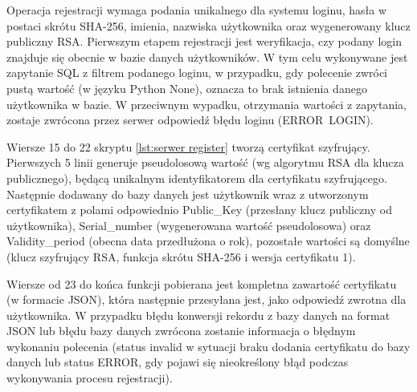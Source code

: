 \documentclass[twoside,10pt]{article}
\begin{document}
Operacja rejestracji wymaga podania unikalnego dla systemu loginu, hasła w postaci skrótu SHA-256, imienia, nazwiska użytkownika oraz wygenerowany klucz publiczny RSA. Pierwszym etapem rejestracji jest weryfikacja, czy podany login znajduje się obecnie w bazie danych użytkowników. W tym celu wykonywane jest zapytanie SQL z filtrem podanego loginu, w przypadku, gdy polecenie zwróci pustą wartość (w języku Python None), oznacza to brak istnienia danego użytkownika w bazie. W przeciwnym wypadku, otrzymania wartości z zapytania, zostaje zwrócona przez serwer odpowiedź błędu loginu (ERROR~LOGIN).

Wiersze 15 do 22 skryptu \ref{lst:serwer register} tworzą certyfikat szyfrujący. Pierwszych 5 linii generuje pseudolosową wartość (wg algorytmu RSA dla klucza publicznego), będącą unikalnym identyfikatorem dla certyfikatu szyfrującego. Następnie dodawany do bazy danych jest użytkownik wraz z utworzonym certyfikatem z polami odpowiednio Public\_Key (przesłany klucz publiczny od użytkownika), Serial\_number (wygenerowana wartość pseudolosowa) oraz Validity\_period (obecna data przedłużona o rok), pozostałe wartości są domyślne (klucz szyfrujący RSA, funkcja skrótu SHA-256 i wersja certyfikatu 1).

Wiersze od 23 do końca funkcji pobierana jest kompletna zawartość certyfikatu (w formacie JSON), która następnie przesyłana jest, jako odpowiedź zwrotna dla użytkownika. W przypadku błędu konwersji rekordu z bazy danych na format JSON lub błędu bazy danych zwrócona zostanie informacja o błędnym wykonaniu polecenia (status invalid w sytuacji braku dodania certyfikatu do bazy danych lub status ERROR, gdy pojawi się nieokreślony błąd podczas wykonywania procesu rejestracji)\cite{programowanie_aplikacji_webowych}.
\newpage
\end{document}
